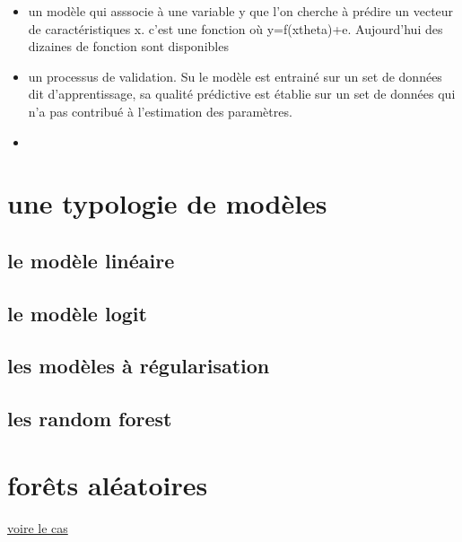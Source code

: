 \documentclass[
]{book}
\begin{document}
\begin{itemize}
\item
  un modèle qui asssocie à une variable y que l'on cherche à prédire un vecteur de caractéristiques x. c'est une fonction où y=f(x\textbar theta)+e. Aujourd'hui des dizaines de fonction sont disponibles
\item
  un processus de validation. Su le modèle est entrainé sur un set de données dit d'apprentissage, sa qualité prédictive est établie sur un set de données qui n'a pas contribué à l'estimation des paramètres.
\item
\end{itemize}

\hypertarget{une-typologie-de-moduxe8les}{%
\section{une typologie de modèles}\label{une-typologie-de-moduxe8les}}

\hypertarget{le-moduxe8le-linuxe9aire}{%
\subsection{le modèle linéaire}\label{le-moduxe8le-linuxe9aire}}

\hypertarget{le-moduxe8le-logit}{%
\subsection{le modèle logit}\label{le-moduxe8le-logit}}

\hypertarget{les-moduxe8les-uxe0-ruxe9gularisation}{%
\subsection{les modèles à régularisation}\label{les-moduxe8les-uxe0-ruxe9gularisation}}

\hypertarget{les-random-forest}{%
\subsection{les random forest}\label{les-random-forest}}

\hypertarget{foruxeats-aluxe9atoires-1}{%
\section{forêts aléatoires}\label{foruxeats-aluxe9atoires-1}}

\href{http://r.benavent.fr/MM.html}{voire le cas}
\end{document}
